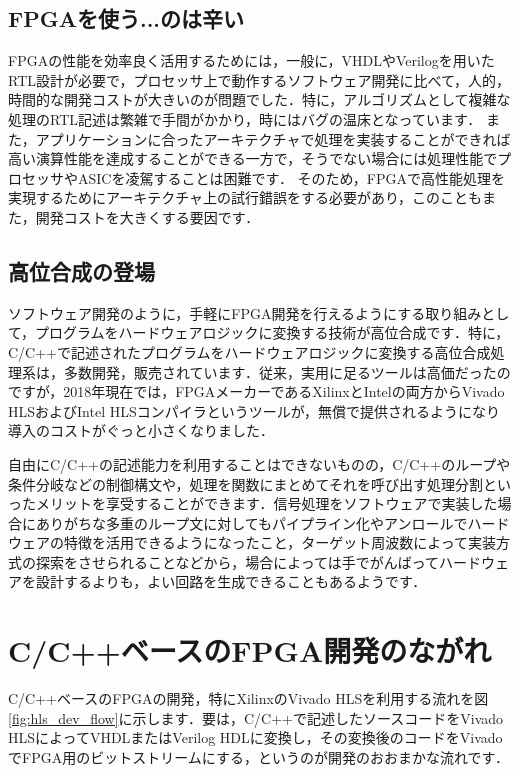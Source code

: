 \documentclass[a4paper,dvipdfmx]{jsarticle}
\begin{document}
\subsection{FPGAを使う...のは辛い}

FPGAの性能を効率良く活用するためには，一般に，VHDLやVerilogを用いたRTL設計が必要で，プロセッサ上で動作するソフトウェア開発に比べて，人的，時間的な開発コストが大きいのが問題でした．特に，アルゴリズムとして複雑な処理のRTL記述は繁雑で手間がかかり，時にはバグの温床となっています．
また，アプリケーションに合ったアーキテクチャで処理を実装することができれば高い演算性能を達成することができる一方で，そうでない場合には処理性能でプロセッサやASICを凌駕することは困難です．
そのため，FPGAで高性能処理を実現するためにアーキテクチャ上の試行錯誤をする必要があり，このこともまた，開発コストを大きくする要因です．

\subsection{高位合成の登場}

ソフトウェア開発のように，手軽にFPGA開発を行えるようにする取り組みとして，プログラムをハードウェアロジックに変換する技術が高位合成です．特に，C/C++で記述されたプログラムをハードウェアロジックに変換する高位合成処理系は，多数開発，販売されています．従来，実用に足るツールは高価だったのですが，2018年現在では，FPGAメーカーであるXilinxとIntelの両方からVivado HLSおよびIntel HLSコンパイラというツールが，無償で提供されるようになり導入のコストがぐっと小さくなりました．

自由にC/C++の記述能力を利用することはできないものの，C/C++のループや条件分岐などの制御構文や，処理を関数にまとめてそれを呼び出す処理分割といったメリットを享受することができます．信号処理をソフトウェアで実装した場合にありがちな多重のループ文に対してもパイプライン化やアンロールでハードウェアの特徴を活用できるようになったこと，ターゲット周波数によって実装方式の探索をさせられることなどから，場合によっては手でがんばってハードウェアを設計するよりも，よい回路を生成できることもあるようです．

\section{C/C++ベースのFPGA開発のながれ}
C/C++ベースのFPGAの開発，特にXilinxのVivado HLSを利用する流れを図\ref{fig:hls_dev_flow}に示します．要は，C/C++で記述したソースコードをVivado HLSによってVHDLまたはVerilog HDLに変換し，その変換後のコードをVivadoでFPGA用のビットストリームにする，というのが開発のおおまかな流れです．
\end{document}
